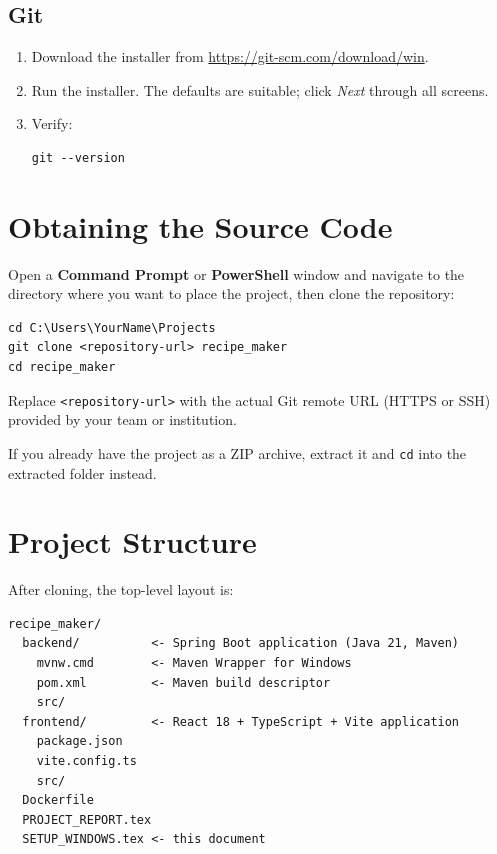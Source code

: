 \documentclass[12pt,a4paper]{article}
\begin{document}
\subsection{Git}
\begin{enumerate}[noitemsep]
  \item Download the installer from \url{https://git-scm.com/download/win}.
  \item Run the installer.  The defaults are suitable; click \emph{Next}
        through all screens.
  \item Verify:
\begin{lstlisting}
git --version
\end{lstlisting}
\end{enumerate}

\section{Obtaining the Source Code}

Open a \textbf{Command Prompt} or \textbf{PowerShell} window and navigate to
the directory where you want to place the project, then clone the repository:

\begin{lstlisting}
cd C:\Users\YourName\Projects
git clone <repository-url> recipe_maker
cd recipe_maker
\end{lstlisting}

Replace \texttt{<repository-url>} with the actual Git remote URL (HTTPS or
SSH) provided by your team or institution.

If you already have the project as a ZIP archive, extract it and
\texttt{cd} into the extracted folder instead.

\section{Project Structure}

After cloning, the top-level layout is:

\begin{lstlisting}
recipe_maker/
  backend/          <- Spring Boot application (Java 21, Maven)
    mvnw.cmd        <- Maven Wrapper for Windows
    pom.xml         <- Maven build descriptor
    src/
  frontend/         <- React 18 + TypeScript + Vite application
    package.json
    vite.config.ts
    src/
  Dockerfile
  PROJECT_REPORT.tex
  SETUP_WINDOWS.tex <- this document
\end{lstlisting}
\end{document}
